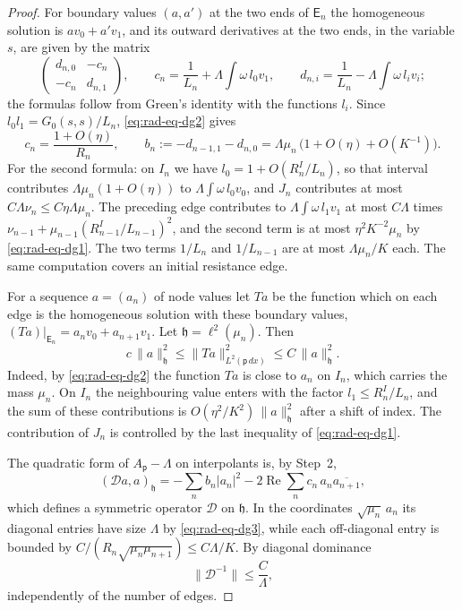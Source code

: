 \begin{proof}
For boundary values $(a,a')$ at the two ends of $\mathsf E_n$ the
homogeneous solution is $av_0+a'v_1$, and its outward derivatives at
the two ends, in the variable $s$, are given by the matrix
\[
 \begin{pmatrix}d_{n,0}&-c_n\\-c_n&d_{n,1}\end{pmatrix},\qquad
 c_n=\frac1{L_n}+\Lambda\int\omega\,l_0v_1,\qquad
 d_{n,i}=\frac1{L_n}-\Lambda\int\omega\,l_iv_i ;
\]
the formulas follow from Green's identity with the functions $l_i$.
Since $l_0l_1=G_0(s,s)/L_n$, \eqref{eq:rad-eq-dg2} gives
\begin{equation}\label{eq:rad-eq-dg3}
 c_n=\frac{1+O(\eta)}{R_n},\qquad
 b_n:=-d_{n-1,1}-d_{n,0}
       =\Lambda\mu_n\,\bigl(1+O(\eta)+O(K^{-1})\bigr).
\end{equation}
For the second formula: on $I_n$ we have $l_0=1+O(R_n^I/L_n)$, so
that interval contributes $\Lambda\mu_n(1+O(\eta))$ to
$\Lambda\int\omega\,l_0v_0$, and $J_n$ contributes at most
$C\Lambda\nu_n\le C\eta\Lambda\mu_n$. The preceding edge contributes
to $\Lambda\int\omega\,l_1v_1$ at most $C\Lambda$ times
$\nu_{n-1}+\mu_{n-1}(R_{n-1}^I/L_{n-1})^2$, and the second term is at
most $\eta^2K^{-2}\mu_n$ by \eqref{eq:rad-eq-dg1}. The two terms
$1/L_n$ and $1/L_{n-1}$ are at most $\Lambda\mu_n/K$ each. The same
computation covers an initial resistance edge.

For a sequence $a=(a_n)$ of node values let $Ta$ be the function which
on each edge is the homogeneous solution with these boundary values,
$(Ta)|_{\mathsf E_n}=a_nv_0+a_{n+1}v_1$. Let
$\mathfrak h=\ell^2(\mu_n)$. Then
\begin{equation}\label{eq:rad-eq-dj1}
 c\,\|a\|_{\mathfrak h}^2\le\|Ta\|_{L^2(\mathsf p\,dx)}^2
                         \le C\,\|a\|_{\mathfrak h}^2 .
\end{equation}
Indeed, by \eqref{eq:rad-eq-dg2} the function $Ta$ is close to $a_n$
on $I_n$, which carries the mass $\mu_n$. On $I_n$ the neighbouring
value enters with the factor $l_1\le R_n^I/L_n$, and the sum of these
contributions is $O(\eta^2/K^2)\,\|a\|_{\mathfrak h}^2$ after a shift
of index. The contribution of $J_n$ is controlled by the last
inequality of \eqref{eq:rad-eq-dg1}.

The quadratic form of $A_{\mathsf p}-\Lambda$ on interpolants is, by
Step~2,
\[
 (\mathcal Da,a)_{\mathfrak h}
   =-\sum_n b_n|a_n|^2-2\operatorname{Re}\sum_n c_n\,a_n\overline{a_{n+1}} ,
\]
which defines a symmetric operator $\mathcal D$ on $\mathfrak h$. In
the coordinates $\sqrt{\mu_n}\,a_n$ its diagonal entries have size
$\Lambda$ by \eqref{eq:rad-eq-dg3}, while each off-diagonal entry is
bounded by $C/(R_n\sqrt{\mu_n\mu_{n+1}})\le C\Lambda/K$. By diagonal
dominance
\[
 \|\mathcal D^{-1}\|\le\frac C\Lambda ,
\]
independently of the number of edges.


\end{proof}
